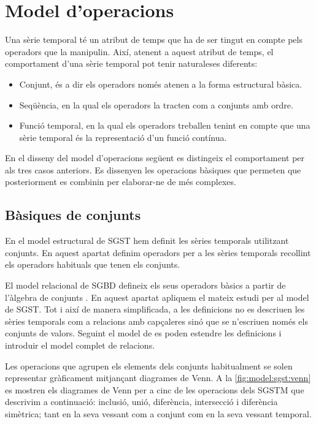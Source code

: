 \section{Model d'operacions}
\label{sec:model:sgst-operacions}

Una sèrie temporal té un atribut de temps que ha de ser tingut en
compte pels operadors que la manipulin.  Així, atenent a aquest
atribut de temps, el comportament d'una sèrie temporal pot tenir
naturaleses diferents:
\begin{itemize}
\item Conjunt, és a dir els operadors només atenen a la forma
  estructural bàsica.
\item Seqüència, en la qual els operadors la tracten com a conjunts
  amb ordre.
\item Funció temporal, en la qual els operadors treballen tenint en
  compte que una sèrie temporal és la representació d'un funció
  contínua.
\end{itemize}


En el disseny del model d'operacions següent es distingeix el
comportament per als tres casos anteriors.  Es dissenyen les
operacions bàsiques que permeten que posteriorment es combinin per
elaborar-ne de més complexes.




\subsection{Bàsiques de conjunts}

En el model estructural de SGST hem definit les sèries temporals
utilitzant conjunts. En aquest apartat definim operadors per a les
sèries temporals recollint els operadors habituals que tenen els
conjunts.

El model relacional de SGBD defineix els seus operadors bàsics a
partir de l'àlgebra de
conjunts \parencite[cap.~6]{date:introduction}. En aquest apartat
apliquem el mateix estudi per al model de SGST. Tot i així de manera
simplificada, a les definicions no es descriuen les sèries temporals
com a relacions amb capçaleres sinó que se n'escriuen només els
conjunts de valors. Seguint el model de \citeauthor{date:introduction}
es poden estendre les definicions i introduir el model complet de
relacions.


Les operacions que agrupen els elements dels conjunts habitualment se
solen representar gràficament mitjançant diagrames de Venn. A la
\autoref{fig:model:sgst:venn} es mostren els diagrames de Venn per a
cinc de les operacions dels SGSTM que descrivim a continuació:
inclusió, unió, diferència, intersecció i diferència simètrica; tant
en la seva vessant com a conjunt com en la seva vessant temporal.



